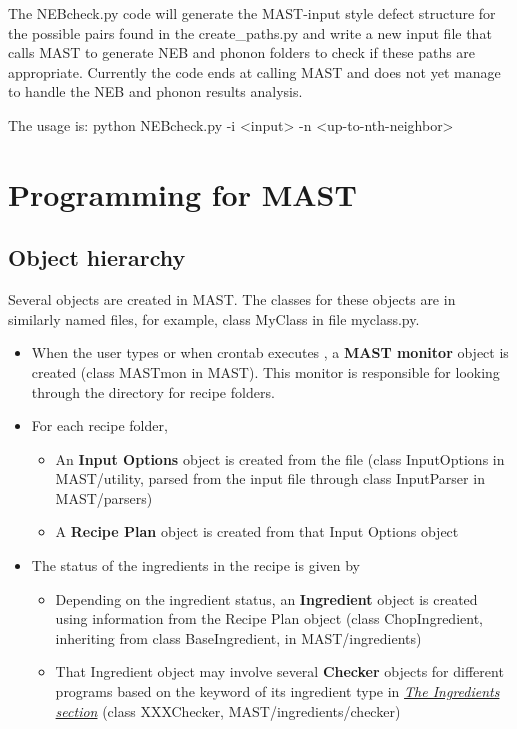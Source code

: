 \documentclass[letterpaper,10pt,english]{sphinxmanual}
\begin{document}
The NEBcheck.py code will generate the MAST-input style defect structure for the possible pairs found in the create\_paths.py and write a new input file that calls MAST to generate NEB and phonon folders to check if these paths are appropriate. Currently the code ends at calling MAST and does not yet manage to handle the NEB and phonon results analysis.

The usage is: python NEBcheck.py -i \textless{}input\textgreater{} -n \textless{}up-to-nth-neighbor\textgreater{}


\chapter{Programming for MAST}
\label{12_0_programming:programming-for-mast}\label{12_0_programming::doc}

\section{Object hierarchy}
\label{12_0_programming:object-hierarchy}
Several objects are created in MAST. The classes for these objects are in similarly named files, for example, class MyClass in file myclass.py.
\begin{itemize}
\item {} 
When the user types  or when crontab executes , a \textbf{MAST monitor} object is created (class MASTmon in MAST). This monitor is responsible for looking through the  directory for recipe folders.

\item {} 
For each recipe folder,
\begin{itemize}
\item {} 
An \textbf{Input Options} object is created from the  file (class InputOptions in MAST/utility, parsed from the input file through class InputParser in MAST/parsers)

\item {} 
A \textbf{Recipe Plan} object is created from that Input Options object

\end{itemize}

\item {} 
The status of the ingredients in the recipe is given by 
\begin{itemize}
\item {} 
Depending on the ingredient status, an \textbf{Ingredient} object is created using information from the Recipe Plan object (class ChopIngredient, inheriting from class BaseIngredient, in MAST/ingredients)

\item {} 
That Ingredient object may involve several \textbf{Checker} objects for different programs based on the  keyword of its ingredient type in {\hyperref[3_1_2_ingredients::doc]{\emph{The Ingredients section}}} (class XXXChecker, MAST/ingredients/checker)

\end{itemize}

\end{itemize}
\end{document}
